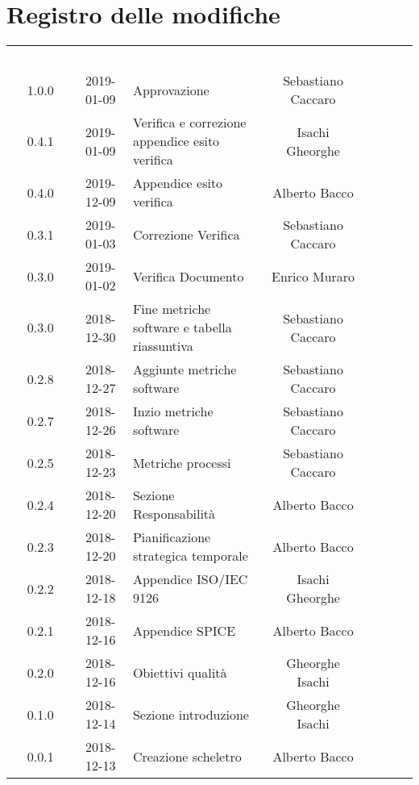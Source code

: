 \section*{Registro delle modifiche}
{
	\renewcommand{\arraystretch}{1.5}
	\centering
	\begin{longtable}{c c C{4cm} c  c }
		\textcolor{white}{\textbf{Versione}} &
		\textcolor{white}{\textbf{Data}} &
		\textcolor{white}{\textbf{Descrizione}} &
		\textcolor{white}{\textbf{Nominativo}} &
		\textcolor{white}{\textbf{Ruolo}}
		\\
		1.0.0 &
		2019-01-09 &
		Approvazione &
		Sebastiano Caccaro &
		\Res{}
		\\
		0.4.1 &
		2019-01-09 &
		Verifica e correzione appendice esito verifica &
		Isachi Gheorghe &
		\ver{}
		\\
		0.4.0 &
		2019-12-09 &
		Appendice esito verifica &
		Alberto Bacco &
		\ver{}
		\\
		0.3.1 &
		2019-01-03 &
		Correzione Verifica &
		Sebastiano Caccaro &
		\ana{}
		\\
		0.3.0 &
		2019-01-02 &
		Verifica Documento &
		Enrico Muraro &
		\ver{}
		\\
		0.3.0 &
		2018-12-30 &
		Fine metriche software e tabella riassuntiva &
		Sebastiano Caccaro &
		\ana{}
		\\
		0.2.8 &
		2018-12-27 &
		Aggiunte metriche software  &
		Sebastiano Caccaro &
		\ana{}
		\\
		0.2.7 &
		2018-12-26 &
		Inzio metriche software &
		Sebastiano Caccaro &
		\ana{}
		\\
		0.2.5 &
		2018-12-23 &
		Metriche processi &
		Sebastiano Caccaro &
		\ana{}
		\\
		0.2.4 &
		2018-12-20 &
		Sezione Responsabilità &
		Alberto Bacco &
		\ana{}
		\\
		0.2.3 &
		2018-12-20 &
		Pianificazione strategica temporale &
		Alberto Bacco &
		\ana{}
		\\
		0.2.2 &
		2018-12-18 &
		Appendice ISO/IEC 9126 &
		Isachi Gheorghe &
		\ana{}
		\\
		0.2.1 &
		2018-12-16 &
		Appendice SPICE &
		Alberto Bacco &
		\ana{}
		\\
		0.2.0 &
		2018-12-16 &
		Obiettivi qualità &
		Gheorghe Isachi &
		\ana{}
		\\
		0.1.0 &
		2018-12-14 &
		Sezione introduzione &
		Gheorghe Isachi&
		\ana{}
		\\
		0.0.1 &
		2018-12-13 &
		Creazione scheletro &
		Alberto Bacco&
		\ana{}
		\\
	\end{longtable}

}